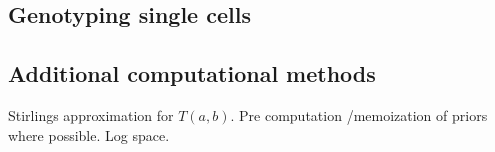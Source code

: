 \documentclass[../main.tex]{subfiles}
\begin{document}
\subsection{Genotyping single cells}


\subsection{Additional computational methods}
Stirlings approximation for $T(a,b)$. Pre computation /memoization of priors where possible. Log space.
\end{document}
